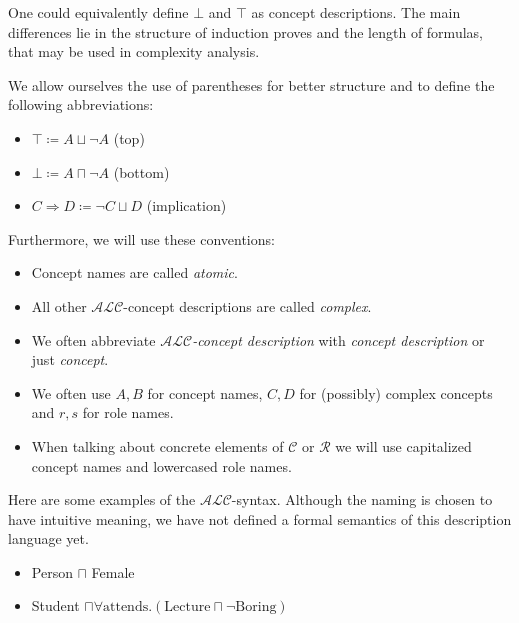 \begin{note}
	One could equivalently define $\bot$ and $\top$ as concept descriptions.
	The main differences lie in the structure of induction proves and the length of formulas, that may be used in complexity analysis.
\end{note}

\begin{notation}
	We allow ourselves the use of parentheses for better structure and to define the following abbreviations:
	\begin{itemize}
		\item $ \top \coloneqq A \sqcup \neg A $ (top)
		\item $ \bot \coloneqq A \sqcap \neg A $ (bottom)
		\item $ C \Rightarrow D \coloneqq \neg C \sqcup D $ (implication)
	\end{itemize}
	Furthermore, we will use these conventions:
	\begin{itemize}
		\item Concept names are called \textit{atomic}.
		\item All other $\mathcal{ALC}$-concept descriptions are called \textit{complex}.
		\item We often abbreviate \textit{$\mathcal{ALC}$-concept description} with \textit{concept description} or just \textit{concept}.
		\item We often use $A, B$ for concept names, $C, D$ for (possibly) complex concepts and $r, s$ for role names.
		\item When talking about concrete elements of $\mathscr{C}$ or $\mathscr{R}$ we will use capitalized concept names and lowercased role names.
	\end{itemize}
\end{notation}

\begin{example}
	Here are some examples of the $\mathcal{ALC}$-syntax.
	Although the naming is chosen to have intuitive meaning, we have not defined a formal semantics of this description language yet.
	\begin{itemize}
		\item Person $\sqcap$ Female
		\item Student $\sqcap \forall \text{attends}.(\text{Lecture}\sqcap \neg \text{Boring})$
	\end{itemize}
\end{example}

